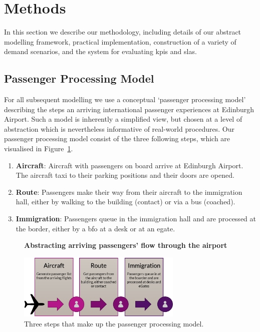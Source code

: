 \documentclass[10pt]{article}
\newcommand*{\figuretitle}[1]{%
    {\centering%
    \textbf{#1}%
    \par\medskip}%
}
\begin{document}
\section{Methods} \label{sec:methods}

In this section we describe our methodology, including details of our abstract modelling framework, practical implementation, construction of a variety of demand scenarios, and the system for evaluating \glspl{kpi} and \glspl{sla}.

\subsection{Passenger Processing Model}

For all subsequent modelling we use a conceptual `passenger processing model' describing the steps an arriving international passenger experiences at Edinburgh Airport. Such a model is inherently a simplified view, but chosen at a level of abstraction which is nevertheless informative of real-world procedures. Our passenger processing model consist of the three following steps, which are visualised in Figure~\ref{fig:PPM_threesteps}.
\begin{enumerate}
    \item \textbf{Aircraft}: Aircraft with passengers on board arrive at Edinburgh Airport. The aircraft taxi to their parking positions and their doors are opened. \label{step:aircraft}
    \item \textbf{Route}: Passengers make their way from their aircraft to the immigration hall, either by walking to the building (contact) or via a bus (coached). \label{step:route}
    \item \textbf{Immigration}: Passengers queue in the immigration hall and are processed at the border, either by a \gls{bfo} at a desk or at an \gls{egate}. \label{step:immigration}
\end{enumerate}
  

\begin{figure}[!ht]
    \centering
    \figuretitle{Abstracting arriving passengers' flow through the airport}
    \includegraphics[width=0.7\textwidth]{figures/ThreeSteps.png}
     \caption{Three steps that make up the passenger processing model.} \label{fig:PPM_threesteps}
\end{figure}
\end{document}
